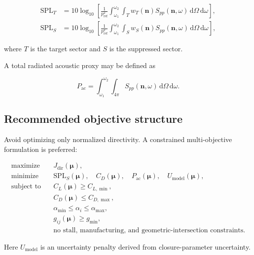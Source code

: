 \documentclass[11pt]{article}
\newcommand{\dd}{\,\mathrm{d}}
\newcommand{\vect}[1]{\bm{#1}}
\begin{document}
\begin{align}
    \mathrm{SPL}_{T}
    &=
    10\log_{10}
    \left[
        \frac{1}{p_{\mathrm{ref}}^2}
        \int_{\omega_1}^{\omega_2}
        \int_{T}
        w_T(\vect{n})
        S_{pp}(\vect{n},\omega)
        \dd\Omega
        \dd\omega
    \right],
    \\
    \mathrm{SPL}_{S}
    &=
    10\log_{10}
    \left[
        \frac{1}{p_{\mathrm{ref}}^2}
        \int_{\omega_1}^{\omega_2}
        \int_{S}
        w_S(\vect{n})
        S_{pp}(\vect{n},\omega)
        \dd\Omega
        \dd\omega
    \right],
\end{align}

where $T$ is the target sector and $S$ is the suppressed sector.

A total radiated acoustic proxy may be defined as

\begin{equation}
    P_{\mathrm{ac}}
    =
    \int_{\omega_1}^{\omega_2}
    \int_{4\pi}
    S_{pp}(\vect{n},\omega)
    \dd\Omega
    \dd\omega.
\end{equation}

\subsection{Recommended objective structure}

Avoid optimizing only normalized directivity. A constrained multi-objective formulation is preferred:

\begin{align}
    \text{maximize} \quad
    & J_{\mathrm{dir}}(\vect{\mu}),
    \\
    \text{minimize} \quad
    & \mathrm{SPL}_{S}(\vect{\mu}),
    \quad
    C_D(\vect{\mu}),
    \quad
    P_{\mathrm{ac}}(\vect{\mu}),
    \quad
    U_{\mathrm{model}}(\vect{\mu}),
    \\
    \text{subject to} \quad
    & C_L(\vect{\mu}) \geq C_{L,\min},
    \\
    & C_D(\vect{\mu}) \leq C_{D,\max},
    \\
    & \alpha_{\min} \leq \alpha_i \leq \alpha_{\max},
    \\
    & g_{ij}(\vect{\mu}) \geq g_{\min},
    \\
    & \text{no stall, manufacturing, and geometric-intersection constraints.}
\end{align}

Here $U_{\mathrm{model}}$ is an uncertainty penalty derived from closure-parameter uncertainty.
\end{document}
